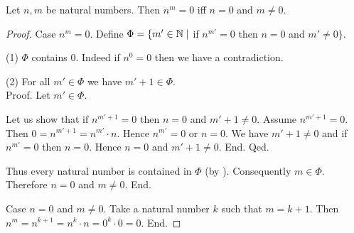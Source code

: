\documentclass[10pt]{article}
\begin{document}
  \begin{forthel}
    \begin{proposition}
      Let $n, m$ be natural numbers.
      Then $n^{m} = 0$ iff $n = 0$ and $m \neq 0$.
    \end{proposition}
    \begin{proof}
      Case $n^{m} = 0$.
        Define $\Phi = \{ m' \in \mathbb{N} \mid$ if $n^{m'} = 0$ then $n = 0$ and $m' \neq 0 \}$.

        (1) $\Phi$ contains $0$.
        Indeed if $n^{0} = 0$ then we have a contradiction.

        (2) For all $m' \in \Phi$ we have $m' + 1 \in \Phi$. \\
        Proof.
          Let $m' \in \Phi$.

          Let us show that if $n^{m' + 1} = 0$ then $n = 0$ and $m' + 1 \neq 0$.
            Assume $n^{m' + 1} = 0$.
            Then $0 = n^{m' + 1} = n^{m'} \cdot n$.
            Hence $n^{m'} = 0$ or $n = 0$.
            We have $m' + 1 \neq 0$ and if $n^{m'} = 0$ then $n = 0$.
            Hence $n = 0$ and $m' + 1 \neq 0$.
          End.
        Qed.

        Thus every natural number is contained in $\Phi$ (by ).
        Consequently $m \in \Phi$.
        Therefore $n = 0$ and $m \neq 0$.
      End.

      Case $n = 0$ and $m \neq 0$.
        Take a natural number $k$ such that $m = k + 1$.
        Then $n^{m}
          = n^{k + 1}
          = n^{k} \cdot n
          = 0^{k} \cdot 0
          = 0$.
      End.
    \end{proof}
  \end{forthel}
\end{document}
